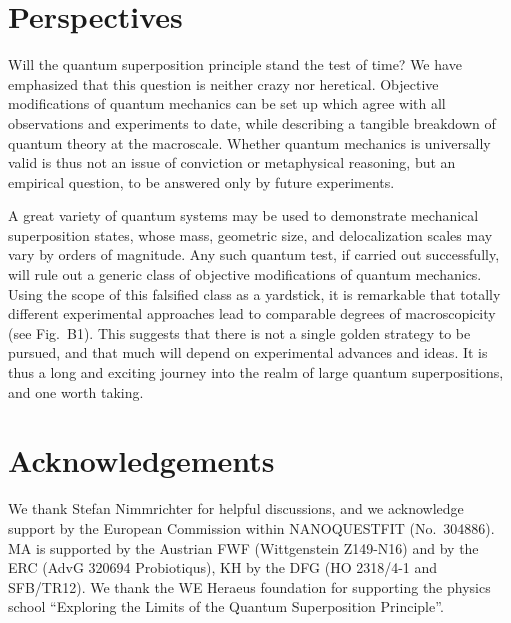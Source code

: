 \documentclass[11pt]{article}
\begin{document}
\section{Perspectives}

Will the quantum superposition principle stand the test of time? We have emphasized that this question is neither crazy nor heretical. Objective modifications of quantum mechanics can be set up which agree with all observations and experiments to date, while describing a tangible breakdown of quantum theory at the macroscale. Whether quantum mechanics is universally valid is thus not an issue of conviction or metaphysical reasoning, but an empirical question, to be answered only by future experiments.

A great variety of quantum systems may be used to demonstrate mechanical superposition states, whose mass, geometric size,  and delocalization scales may vary by orders of magnitude. Any such quantum test, if carried out successfully, will rule out a generic class of objective modifications of quantum mechanics.
Using the scope of this  falsified class as a
yardstick, it is remarkable that totally different experimental approaches
lead to comparable degrees of macroscopicity (see Fig.~B1).
This suggests that there is not a single golden strategy to be pursued, and that much will depend on experimental advances and ideas.
It is thus a long and exciting journey into the realm of large quantum superpositions, and one worth taking.




\section{Acknowledgements}

We thank Stefan Nimmrichter for helpful discussions, and we
acknowledge support by the European Commission within NANOQUESTFIT (No.~304886). MA is supported by the Austrian FWF (Wittgenstein Z149-N16) and by the ERC (AdvG 320694 Probiotiqus), KH by the DFG (HO 2318/4-1 and SFB/TR12).  We thank the WE Heraeus foundation for supporting the physics school ``Exploring the Limits of the Quantum Superposition Principle''.
\end{document}
